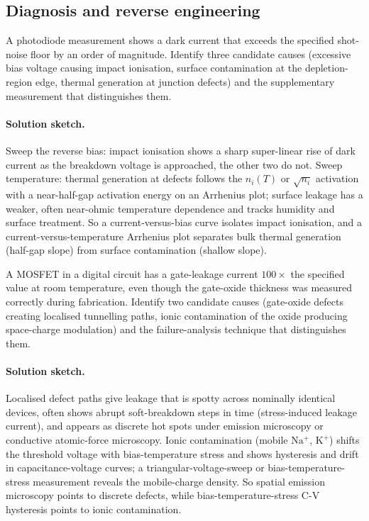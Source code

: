 \subsection*{Diagnosis and reverse engineering}

\begin{exercise}
A photodiode measurement shows a dark current that exceeds the
specified shot-noise floor by an order of magnitude. Identify three
candidate causes (excessive bias voltage causing impact ionisation,
surface contamination at the depletion-region edge, thermal
generation at junction defects) and the supplementary measurement
that distinguishes them.
\paragraph{Solution sketch.} Sweep the reverse bias: impact ionisation
shows a sharp super-linear rise of dark current as the breakdown voltage
is approached, the other two do not. Sweep temperature: thermal
generation at defects follows the $n_{i}(T)$ or $\sqrt{n_{i}}$
activation with a near-half-gap activation energy on an Arrhenius plot;
surface leakage has a weaker, often near-ohmic temperature dependence
and tracks humidity and surface treatment. So a current-versus-bias
curve isolates impact ionisation, and a current-versus-temperature
Arrhenius plot separates bulk thermal generation (half-gap slope) from
surface contamination (shallow slope).
\end{exercise}

\begin{exercise}
A MOSFET in a digital circuit has a gate-leakage current $100\times$
the specified value at room temperature, even though the gate-oxide
thickness was measured correctly during fabrication. Identify two
candidate causes (gate-oxide defects creating localised tunnelling
paths, ionic contamination of the oxide producing space-charge
modulation) and the failure-analysis technique that distinguishes
them.
\paragraph{Solution sketch.} Localised defect paths give leakage that is
spotty across nominally identical devices, often shows abrupt
soft-breakdown steps in time (stress-induced leakage current), and
appears as discrete hot spots under emission microscopy or conductive
atomic-force microscopy. Ionic contamination (mobile $\mathrm{Na^{+}}$,
$\mathrm{K^{+}}$) shifts the threshold voltage with bias-temperature
stress and shows hysteresis and drift in capacitance-voltage curves; a
triangular-voltage-sweep or bias-temperature-stress measurement reveals
the mobile-charge density. So spatial emission microscopy points to
discrete defects, while bias-temperature-stress C-V hysteresis points to
ionic contamination.
\end{exercise}

